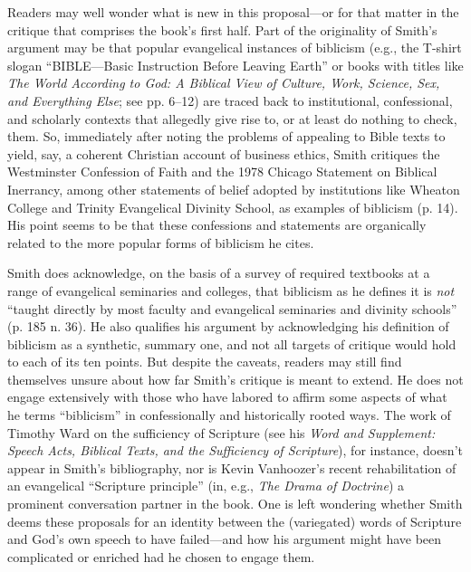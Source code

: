 Readers may well wonder what is new in this proposal—or for that matter in the critique that comprises the book’s first half. Part of the originality of Smith’s argument may be that popular evangelical instances of biblicism (e.g., the T-shirt slogan “BIBLE—Basic Instruction Before Leaving Earth” or books with titles like \emph{The World According to God: A Biblical View of Culture, Work, Science, Sex, and Everything Else}; see pp. 6--12) are traced back to institutional, confessional, and scholarly contexts that allegedly give rise to, or at least do nothing to check, them. So, immediately after noting the problems of appealing to Bible texts to yield, say, a coherent Christian account of business ethics, Smith critiques the Westminster Confession of Faith and the 1978 Chicago Statement on Biblical Inerrancy, among other statements of belief adopted by institutions like Wheaton College and Trinity Evangelical Divinity School, as examples of biblicism (p. 14). His point seems to be that these confessions and statements are organically related to the more popular forms of biblicism he cites.

Smith does acknowledge, on the basis of a survey of required textbooks at a range of evangelical seminaries and colleges, that biblicism as he defines it is \emph{not} “taught directly by most faculty and evangelical seminaries and divinity schools” (p. 185 n. 36). He also qualifies his argument by acknowledging his definition of biblicism as a synthetic, summary one, and not all targets of critique would hold to each of its ten points. But despite the caveats, readers may still find themselves unsure about how far Smith’s critique is meant to extend. He does not engage extensively with those who have labored to affirm some aspects of what he terms “biblicism” in confessionally and historically rooted ways. The work of Timothy Ward on the sufficiency of Scripture (see his \emph{Word and Supplement: Speech Acts, Biblical Texts, and the Sufficiency of Scripture}), for instance, doesn’t appear in Smith’s bibliography, nor is Kevin Vanhoozer’s recent rehabilitation of an evangelical “Scripture principle” (in, e.g., \emph{The Drama of Doctrine}) a prominent conversation partner in the book. One is left wondering whether Smith deems these proposals for an identity between the (variegated) words of Scripture and God’s own speech to have failed—and how his argument might have been complicated or enriched had he chosen to engage them.


